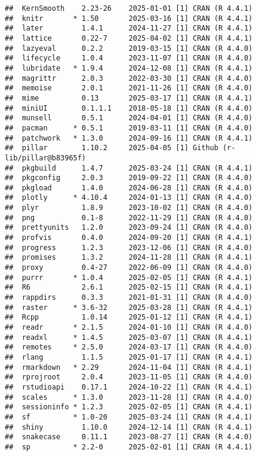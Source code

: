 \documentclass[
]{article}
\begin{document}
\begin{verbatim}
##  KernSmooth    2.23-26    2025-01-01 [1] CRAN (R 4.4.1)
##  knitr       * 1.50       2025-03-16 [1] CRAN (R 4.4.1)
##  later         1.4.1      2024-11-27 [1] CRAN (R 4.4.1)
##  lattice       0.22-7     2025-04-02 [1] CRAN (R 4.4.1)
##  lazyeval      0.2.2      2019-03-15 [1] CRAN (R 4.4.0)
##  lifecycle     1.0.4      2023-11-07 [1] CRAN (R 4.4.0)
##  lubridate   * 1.9.4      2024-12-08 [1] CRAN (R 4.4.1)
##  magrittr      2.0.3      2022-03-30 [1] CRAN (R 4.4.0)
##  memoise       2.0.1      2021-11-26 [1] CRAN (R 4.4.0)
##  mime          0.13       2025-03-17 [1] CRAN (R 4.4.1)
##  miniUI        0.1.1.1    2018-05-18 [1] CRAN (R 4.4.0)
##  munsell       0.5.1      2024-04-01 [1] CRAN (R 4.4.0)
##  pacman      * 0.5.1      2019-03-11 [1] CRAN (R 4.4.0)
##  patchwork   * 1.3.0      2024-09-16 [1] CRAN (R 4.4.1)
##  pillar        1.10.2     2025-04-05 [1] Github (r-lib/pillar@b83965f)
##  pkgbuild      1.4.7      2025-03-24 [1] CRAN (R 4.4.1)
##  pkgconfig     2.0.3      2019-09-22 [1] CRAN (R 4.4.0)
##  pkgload       1.4.0      2024-06-28 [1] CRAN (R 4.4.0)
##  plotly      * 4.10.4     2024-01-13 [1] CRAN (R 4.4.0)
##  plyr          1.8.9      2023-10-02 [1] CRAN (R 4.4.0)
##  png           0.1-8      2022-11-29 [1] CRAN (R 4.4.0)
##  prettyunits   1.2.0      2023-09-24 [1] CRAN (R 4.4.0)
##  profvis       0.4.0      2024-09-20 [1] CRAN (R 4.4.1)
##  progress      1.2.3      2023-12-06 [1] CRAN (R 4.4.0)
##  promises      1.3.2      2024-11-28 [1] CRAN (R 4.4.1)
##  proxy         0.4-27     2022-06-09 [1] CRAN (R 4.4.0)
##  purrr       * 1.0.4      2025-02-05 [1] CRAN (R 4.4.1)
##  R6            2.6.1      2025-02-15 [1] CRAN (R 4.4.1)
##  rappdirs      0.3.3      2021-01-31 [1] CRAN (R 4.4.0)
##  raster      * 3.6-32     2025-03-28 [1] CRAN (R 4.4.1)
##  Rcpp          1.0.14     2025-01-12 [1] CRAN (R 4.4.1)
##  readr       * 2.1.5      2024-01-10 [1] CRAN (R 4.4.0)
##  readxl      * 1.4.5      2025-03-07 [1] CRAN (R 4.4.1)
##  remotes     * 2.5.0      2024-03-17 [1] CRAN (R 4.4.0)
##  rlang         1.1.5      2025-01-17 [1] CRAN (R 4.4.1)
##  rmarkdown   * 2.29       2024-11-04 [1] CRAN (R 4.4.1)
##  rprojroot     2.0.4      2023-11-05 [1] CRAN (R 4.4.0)
##  rstudioapi    0.17.1     2024-10-22 [1] CRAN (R 4.4.1)
##  scales      * 1.3.0      2023-11-28 [1] CRAN (R 4.4.0)
##  sessioninfo * 1.2.3      2025-02-05 [1] CRAN (R 4.4.1)
##  sf          * 1.0-20     2025-03-24 [1] CRAN (R 4.4.1)
##  shiny         1.10.0     2024-12-14 [1] CRAN (R 4.4.1)
##  snakecase     0.11.1     2023-08-27 [1] CRAN (R 4.4.0)
##  sp          * 2.2-0      2025-02-01 [1] CRAN (R 4.4.1)

\end{verbatim}
\end{document}

